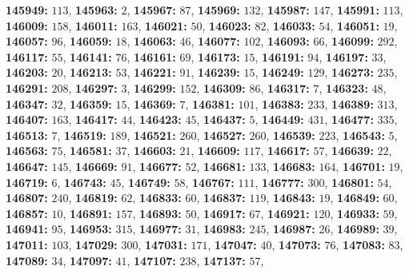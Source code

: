 \textsf{\bfseries 145949:} $113$, \textsf{\bfseries 145963:} $2$, \textsf{\bfseries 145967:} $87$, \textsf{\bfseries 145969:} $132$, \textsf{\bfseries 145987:} $147$, \textsf{\bfseries 145991:} $113$, \textsf{\bfseries 146009:} $158$, \textsf{\bfseries 146011:} $163$, \textsf{\bfseries 146021:} $50$, \textsf{\bfseries 146023:} $82$, \textsf{\bfseries 146033:} $54$, \textsf{\bfseries 146051:} $19$, \textsf{\bfseries 146057:} $96$, \textsf{\bfseries 146059:} $18$, \textsf{\bfseries 146063:} $46$, \textsf{\bfseries 146077:} $102$, \textsf{\bfseries 146093:} $66$, \textsf{\bfseries 146099:} $292$, \textsf{\bfseries 146117:} $55$, \textsf{\bfseries 146141:} $76$, \textsf{\bfseries 146161:} $69$, \textsf{\bfseries 146173:} $15$, \textsf{\bfseries 146191:} $94$, \textsf{\bfseries 146197:} $33$, \textsf{\bfseries 146203:} $20$, \textsf{\bfseries 146213:} $53$, \textsf{\bfseries 146221:} $91$, \textsf{\bfseries 146239:} $15$, \textsf{\bfseries 146249:} $129$, \textsf{\bfseries 146273:} $235$, \textsf{\bfseries 146291:} $208$, \textsf{\bfseries 146297:} $3$, \textsf{\bfseries 146299:} $152$, \textsf{\bfseries 146309:} $86$, \textsf{\bfseries 146317:} $7$, \textsf{\bfseries 146323:} $48$, \textsf{\bfseries 146347:} $32$, \textsf{\bfseries 146359:} $15$, \textsf{\bfseries 146369:} $7$, \textsf{\bfseries 146381:} $101$, \textsf{\bfseries 146383:} $233$, \textsf{\bfseries 146389:} $313$, \textsf{\bfseries 146407:} $163$, \textsf{\bfseries 146417:} $44$, \textsf{\bfseries 146423:} $45$, \textsf{\bfseries 146437:} $5$, \textsf{\bfseries 146449:} $431$, \textsf{\bfseries 146477:} $335$, \textsf{\bfseries 146513:} $7$, \textsf{\bfseries 146519:} $189$, \textsf{\bfseries 146521:} $260$, \textsf{\bfseries 146527:} $260$, \textsf{\bfseries 146539:} $223$, \textsf{\bfseries 146543:} $5$, \textsf{\bfseries 146563:} $75$, \textsf{\bfseries 146581:} $37$, \textsf{\bfseries 146603:} $21$, \textsf{\bfseries 146609:} $117$, \textsf{\bfseries 146617:} $57$, \textsf{\bfseries 146639:} $22$, \textsf{\bfseries 146647:} $145$, \textsf{\bfseries 146669:} $91$, \textsf{\bfseries 146677:} $52$, \textsf{\bfseries 146681:} $133$, \textsf{\bfseries 146683:} $164$, \textsf{\bfseries 146701:} $19$, \textsf{\bfseries 146719:} $6$, \textsf{\bfseries 146743:} $45$, \textsf{\bfseries 146749:} $58$, \textsf{\bfseries 146767:} $111$, \textsf{\bfseries 146777:} $300$, \textsf{\bfseries 146801:} $54$, \textsf{\bfseries 146807:} $240$, \textsf{\bfseries 146819:} $62$, \textsf{\bfseries 146833:} $60$, \textsf{\bfseries 146837:} $119$, \textsf{\bfseries 146843:} $19$, \textsf{\bfseries 146849:} $60$, \textsf{\bfseries 146857:} $10$, \textsf{\bfseries 146891:} $157$, \textsf{\bfseries 146893:} $50$, \textsf{\bfseries 146917:} $67$, \textsf{\bfseries 146921:} $120$, \textsf{\bfseries 146933:} $59$, \textsf{\bfseries 146941:} $95$, \textsf{\bfseries 146953:} $315$, \textsf{\bfseries 146977:} $31$, \textsf{\bfseries 146983:} $245$, \textsf{\bfseries 146987:} $26$, \textsf{\bfseries 146989:} $39$, \textsf{\bfseries 147011:} $103$, \textsf{\bfseries 147029:} $300$, \textsf{\bfseries 147031:} $171$, \textsf{\bfseries 147047:} $40$, \textsf{\bfseries 147073:} $76$, \textsf{\bfseries 147083:} $83$, \textsf{\bfseries 147089:} $34$, \textsf{\bfseries 147097:} $41$, \textsf{\bfseries 147107:} $238$, \textsf{\bfseries 147137:} $57$, 
